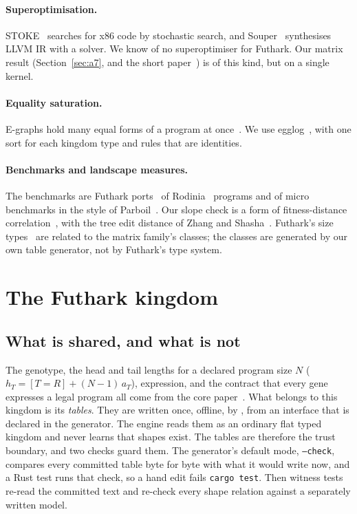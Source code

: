 \documentclass[sigconf,nonacm]{acmart}
\DeclareRobustCommand{\src}[1]{{\footnotesize\path{#1}}}
\begin{document}
\paragraph{Superoptimisation.}
STOKE~\cite{schkufza2013stoke} searches for x86 code by stochastic search, and
Souper~\cite{sasnauskas2017souper} synthesises LLVM IR with a solver. We know of
no superoptimiser for Futhark. Our matrix result
(Section~\ref{sec:a7}, and the short paper~\cite{morgan2026a7}) is of this kind,
but on a single kernel.

\paragraph{Equality saturation.}
E-graphs hold many equal forms of a program at once~\cite{tate2009equality,willsey2021egg}.
We use egglog~\cite{zhang2023egglog}, with one sort for each kingdom type and
rules that are identities.

\paragraph{Benchmarks and landscape measures.}
The benchmarks are Futhark ports~\cite{futharkbenchmarks} of
Rodinia~\cite{che2009rodinia} programs and of micro benchmarks in the style of
Parboil~\cite{stratton2012parboil}. Our slope check is a form of fitness-distance
correlation~\cite{jones1995fdc}, with the tree edit distance of Zhang and
Shasha~\cite{zhang1989ted}. Futhark's size
types~\cite{henriksen2021sizedependent} are related to the matrix family's
classes; the classes are generated by our own table generator,
not by Futhark's type system.

\section{The Futhark kingdom}
\label{sec:kingdom}

\subsection{What is shared, and what is not}
The genotype, the head and tail lengths for a declared program size $N$
($h_T=[T{=}R]+(N-1)\,a_T$), expression, and the contract that every gene
expresses a legal program all come from the core paper~\cite{morgan_core}.
What belongs to this kingdom is its \emph{tables}. They are written once,
offline, by \src{kingdoms/futhark/gen_tables.py}, from an interface
that is declared in the generator. The engine reads them as an ordinary flat
typed kingdom and never learns that shapes exist. The tables are therefore the
trust boundary, and two checks guard them. The generator's default mode,
\texttt{--check}, compares every committed table byte for byte with what it
would write now, and a Rust test runs that check, so a hand edit fails
\texttt{cargo test}. Then witness tests re-read the committed text and re-check
every shape relation against a separately written model.
\end{document}
